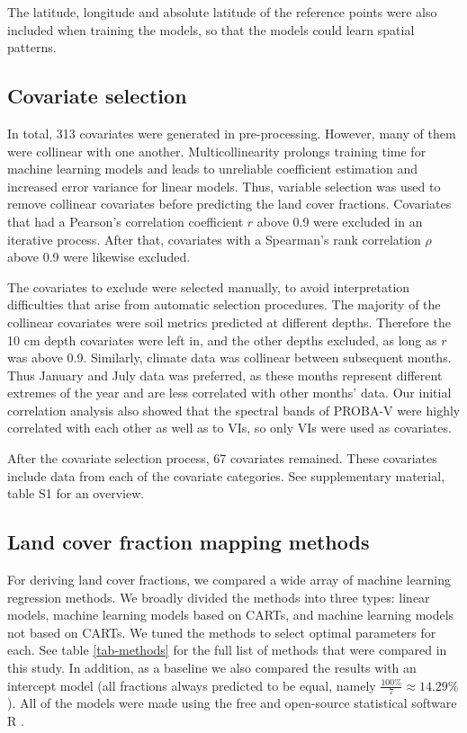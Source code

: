 \documentclass[review,authoryear,3p]{elsarticle}
\begin{document}
The latitude, longitude and absolute latitude of the reference points were also included when training the models, so that the models could learn spatial patterns.

\subsection{Covariate selection}
\label{sec-covariate-selection}

In total, 313 covariates were generated in pre-processing.
However, many of them were collinear with one another.
Multicollinearity prolongs training time for machine learning models and leads to unreliable coefficient estimation and increased error variance for linear models.
Thus, variable selection was used to remove collinear covariates before predicting the land cover fractions.
Covariates that had a Pearson's correlation coefficient $r$ \citep{pearson_notes_1895} above 0.9 were excluded in an iterative process.
After that, covariates with a Spearman's rank correlation $\rho$ \citep{spearman1904rank} above 0.9 were likewise excluded.

The covariates to exclude were selected manually, to avoid interpretation difficulties that arise from automatic selection procedures.
The majority of the collinear covariates were soil metrics predicted at different depths.
Therefore the 10 cm depth covariates were left in, and the other depths excluded, as long as $r$ was above 0.9.
Similarly, climate data was collinear between subsequent months. Thus January and July data was preferred, as these months represent different extremes of the year and are less correlated with other months' data.
Our initial correlation analysis also showed that the spectral bands of PROBA-V were highly correlated with each other as well as to \glspl{VI}, so only \glspl{VI} were used as covariates.

After the covariate selection process, 67 covariates remained.
These covariates include data from each of the covariate categories.
See supplementary material, table S1 for an overview.

\subsection{Land cover fraction mapping methods}

For deriving land cover fractions, we compared a wide array of machine learning regression methods.
We broadly divided the methods into three types: linear models, machine learning models based on \glspl{CART}, and machine learning models not based on \glspl{CART}.
We tuned the methods to select optimal parameters for each.
See table \ref{tab-methods} for the full list of methods that were compared in this study.
In addition, as a baseline we also compared the results with an intercept model (all fractions always predicted to be equal, namely $\frac{100\%}{7}\approx14.29\%$).
All of the models were made using the free and open-source statistical software R \citep{r_2019}.
\end{document}
